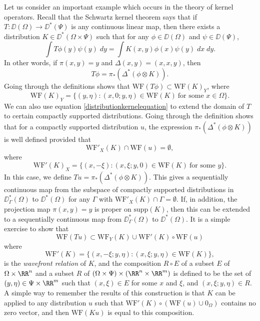 Let us consider an important example which occurs in the theory of kernel operators. Recall that the Schwartz kernel theorem says that if $T: \DD(\Omega) \to \DD^*(\Psi)$ is any continuous linear map, then there exists a distribution $K \in \DD^*(\Omega \times \Psi)$ such that for any $\phi \in \DD(\Omega)$ and $\psi \in \DD(\Psi)$,
%
\[ \int T\phi(y) \psi(y)\; dy = \int K(x,y) \phi(x) \psi(y)\; dx\; dy. \]
%
In other words, if $\pi(x,y) = y$ and $\Delta(x,y) = (x,x,y)$, then
%
\begin{equation} \label{distributionkernelequation}
    T\phi = \pi_*(\Delta^* (\phi \otimes K)).
\end{equation}
%
Going through the definitions shows that $\text{WF}(T\phi) \subset \text{WF}(K)_Y$, where
%
\[ \text{WF}(K)_Y = \{ (y,\eta) : (x,0;y,\eta) \in \text{WF}(K)\ \text{for some $x \in \Omega$} \}. \]
%
We can also use equation \eqref{distributionkernelequation} to extend the domain of $T$ to certain compactly supported distributions. Going through the definition shows that for a compactly supported distribution $u$, the expression $\pi_*(\Delta^*(\phi \otimes K))$ is well defined provided that
%
\[ \text{WF}'_X(K) \cap \text{WF}(u) = \emptyset, \]
%
where
%
\[ \text{WF}'(K)_X = \{ (x,-\xi) : (x,\xi;y,0) \in \text{WF}(K)\ \text{for some $y$} \}. \]
%
In this case, we define $Tu = \pi_*(\Delta^*(\phi \otimes K))$. This gives a sequentially continuous map from the subspace of compactly supported distributions in $\DD^*_\Gamma(\Omega)$ to $\DD^*(\Omega)$ for any $\Gamma$ with $\text{WF}'_X(K) \cap \Gamma = \emptyset$. If, in addition, the projection map $\pi(x,y) = y$ is proper on $\text{supp}(K)$, then this can be extended to a sequentially continuous map from $\DD^*_\Gamma(\Omega)$ to $\DD^*(\Omega)$. It is a simple exercise to show that
%
\[ \text{WF}(Tu) \subset \text{WF}_Y(K) \cup \text{WF}'(K) \circ \text{WF}(u) \]
%
where
%
\[ \text{WF}'(K) = \{ (x,-\xi;y,\eta) : (x,\xi;y,\eta) \in \text{WF}(K) \}, \]
%
is the \emph{wavefront relation} of $K$, and the composition $R \circ E$ of a subset $E$ of $\Omega \times \RR^n$ and a subset $R$ of $(\Omega \times \Psi) \times (\RR^n \times \RR^m)$ is defined to be the set of $(y,\eta) \in \Psi \times \RR^m$ such that $(x,\xi) \in E$ for some $x$ and $\xi$, and $(x,\xi;y,\eta) \in R$. A simple way to remember the results of this construction is that $K$ can be applied to any distribution $u$ such that $\text{WF}'(K) \circ (\text{WF}(u) \cup 0_\Omega)$ contains no zero vector, and then $\text{WF}(Ku)$ is equal to this composition.

